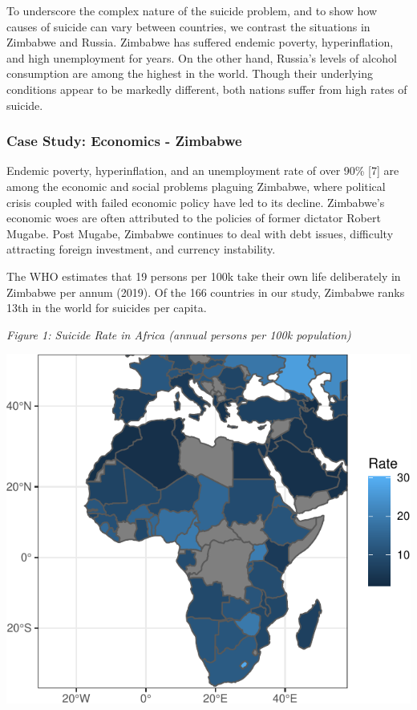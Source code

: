 \documentclass[]{article}
\begin{document}
To underscore the complex nature of the suicide problem, and to show how
causes of suicide can vary between countries, we contrast the situations
in Zimbabwe and Russia. Zimbabwe has suffered endemic poverty,
hyperinflation, and high unemployment for years. On the other hand,
Russia's levels of alcohol consumption are among the highest in the
world. Though their underlying conditions appear to be markedly
different, both nations suffer from high rates of suicide.

\subsubsection{Case Study: Economics -
Zimbabwe}\label{case-study-economics---zimbabwe}

Endemic poverty, hyperinflation, and an unemployment rate of over 90\%
{[}7{]} are among the economic and social problems plaguing Zimbabwe,
where political crisis coupled with failed economic policy have led to
its decline. Zimbabwe's economic woes are often attributed to the
policies of former dictator Robert Mugabe. Post Mugabe, Zimbabwe
continues to deal with debt issues, difficulty attracting foreign
investment, and currency instability.

The WHO estimates that 19 persons per 100k take their own life
deliberately in Zimbabwe per annum (2019). Of the 166 countries in our
study, Zimbabwe ranks 13th in the world for suicides per capita.

\emph{Figure 1: Suicide Rate in Africa (annual persons per 100k
population)}

\begin{center}\includegraphics{Project_Report_files/figure-latex/africa_map_plot-1} \end{center}
\end{document}
